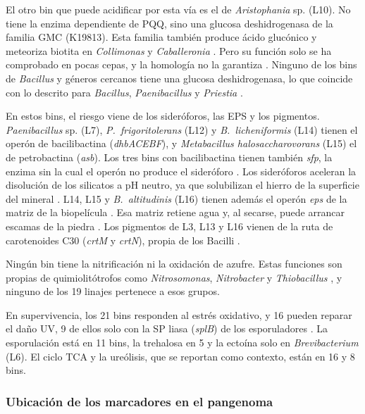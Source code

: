\begin{nuevo}
El otro bin que puede acidificar por esta vía es el de \textit{Aristophania}
sp. (L10). No tiene la enzima dependiente de PQQ, sino una glucosa
deshidrogenasa de la familia GMC (K19813). Esta familia también produce ácido
glucónico y meteoriza biotita en \textit{Collimonas} y \textit{Caballeronia}
\cite{picard2021, blanconouche2024}. Pero su función solo se ha comprobado en
pocas cepas, y la homología no la garantiza \cite{uroz2026}. Ninguno de los
bins de \textit{Bacillus} y géneros cercanos tiene una glucosa
deshidrogenasa, lo que coincide con lo descrito para \textit{Bacillus},
\textit{Paenibacillus} y \textit{Priestia} \cite{uroz2026}.

En estos bins, el riesgo viene de los sideróforos, las EPS y los pigmentos.
\textit{Paenibacillus} sp. (L7), \textit{P.~frigoritolerans} (L12) y
\textit{B.~licheniformis} (L14) tienen el operón de bacilibactina
(\textit{dhbACEBF}), y \textit{Metabacillus halosaccharovorans} (L15) el de
petrobactina (\textit{asb}). Los tres bins con bacilibactina tienen también
\textit{sfp}, la enzima sin la cual el operón no produce el sideróforo
\cite{may2001}. Los sideróforos aceleran la disolución de los silicatos a pH
neutro, ya que solubilizan el hierro de la superficie del mineral
\cite{dalvie2026}. L14, L15 y \textit{B.~altitudinis} (L16) tienen además el
operón \textit{eps} de la matriz de la biopelícula \cite{arnaouteli2021}. Esa
matriz retiene agua y, al secarse, puede arrancar escamas de la piedra
\cite{gaylarde2021}. Los pigmentos de L3, L13 y L16 vienen de la ruta de
carotenoides C30 (\textit{crtM} y \textit{crtN}), propia de los Bacilli
\cite{santanamolina2022}.

Ningún bin tiene la nitrificación ni la oxidación de azufre. Estas funciones
son propias de quimiolitótrofos como \textit{Nitrosomonas},
\textit{Nitrobacter} y \textit{Thiobacillus} \cite{dakal2012}, y ninguno de los
19 linajes pertenece a esos grupos.

En supervivencia, los 21 bins responden al estrés oxidativo, y 16 pueden
reparar el daño UV, 9 de ellos solo con la SP liasa (\textit{splB}) de los
esporuladores \cite{goosen2008}. La esporulación está en 11 bins, la
trehalosa en 5 y la ectoína solo en \textit{Brevibacterium} (L6). El ciclo TCA
y la ureólisis, que se reportan como contexto, están en 16 y 8 bins.

\subsubsection{Ubicación de los marcadores en el pangenoma}
\label{subsubsec:res_fisher}


\end{nuevo}
